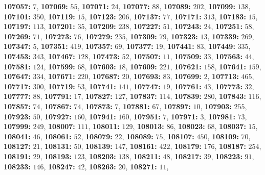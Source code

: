 \textsf{\bfseries 107057:} $7$, \textsf{\bfseries 107069:} $55$, \textsf{\bfseries 107071:} $24$, \textsf{\bfseries 107077:} $88$, \textsf{\bfseries 107089:} $202$, \textsf{\bfseries 107099:} $138$, \textsf{\bfseries 107101:} $350$, \textsf{\bfseries 107119:} $15$, \textsf{\bfseries 107123:} $206$, \textsf{\bfseries 107137:} $77$, \textsf{\bfseries 107171:} $313$, \textsf{\bfseries 107183:} $15$, \textsf{\bfseries 107197:} $113$, \textsf{\bfseries 107201:} $35$, \textsf{\bfseries 107209:} $238$, \textsf{\bfseries 107227:} $51$, \textsf{\bfseries 107243:} $24$, \textsf{\bfseries 107251:} $58$, \textsf{\bfseries 107269:} $71$, \textsf{\bfseries 107273:} $76$, \textsf{\bfseries 107279:} $235$, \textsf{\bfseries 107309:} $79$, \textsf{\bfseries 107323:} $13$, \textsf{\bfseries 107339:} $269$, \textsf{\bfseries 107347:} $5$, \textsf{\bfseries 107351:} $419$, \textsf{\bfseries 107357:} $69$, \textsf{\bfseries 107377:} $19$, \textsf{\bfseries 107441:} $83$, \textsf{\bfseries 107449:} $335$, \textsf{\bfseries 107453:} $343$, \textsf{\bfseries 107467:} $128$, \textsf{\bfseries 107473:} $52$, \textsf{\bfseries 107507:} $11$, \textsf{\bfseries 107509:} $33$, \textsf{\bfseries 107563:} $44$, \textsf{\bfseries 107581:} $124$, \textsf{\bfseries 107599:} $68$, \textsf{\bfseries 107603:} $18$, \textsf{\bfseries 107609:} $221$, \textsf{\bfseries 107621:} $158$, \textsf{\bfseries 107641:} $159$, \textsf{\bfseries 107647:} $334$, \textsf{\bfseries 107671:} $220$, \textsf{\bfseries 107687:} $20$, \textsf{\bfseries 107693:} $83$, \textsf{\bfseries 107699:} $2$, \textsf{\bfseries 107713:} $465$, \textsf{\bfseries 107717:} $300$, \textsf{\bfseries 107719:} $53$, \textsf{\bfseries 107741:} $141$, \textsf{\bfseries 107747:} $19$, \textsf{\bfseries 107761:} $43$, \textsf{\bfseries 107773:} $32$, \textsf{\bfseries 107777:} $88$, \textsf{\bfseries 107791:} $17$, \textsf{\bfseries 107827:} $127$, \textsf{\bfseries 107837:} $114$, \textsf{\bfseries 107839:} $280$, \textsf{\bfseries 107843:} $116$, \textsf{\bfseries 107857:} $74$, \textsf{\bfseries 107867:} $74$, \textsf{\bfseries 107873:} $7$, \textsf{\bfseries 107881:} $67$, \textsf{\bfseries 107897:} $10$, \textsf{\bfseries 107903:} $255$, \textsf{\bfseries 107923:} $50$, \textsf{\bfseries 107927:} $160$, \textsf{\bfseries 107941:} $160$, \textsf{\bfseries 107951:} $7$, \textsf{\bfseries 107971:} $3$, \textsf{\bfseries 107981:} $73$, \textsf{\bfseries 107999:} $249$, \textsf{\bfseries 108007:} $111$, \textsf{\bfseries 108011:} $129$, \textsf{\bfseries 108013:} $86$, \textsf{\bfseries 108023:} $68$, \textsf{\bfseries 108037:} $15$, \textsf{\bfseries 108041:} $46$, \textsf{\bfseries 108061:} $52$, \textsf{\bfseries 108079:} $22$, \textsf{\bfseries 108089:} $75$, \textsf{\bfseries 108107:} $450$, \textsf{\bfseries 108109:} $70$, \textsf{\bfseries 108127:} $21$, \textsf{\bfseries 108131:} $50$, \textsf{\bfseries 108139:} $147$, \textsf{\bfseries 108161:} $422$, \textsf{\bfseries 108179:} $176$, \textsf{\bfseries 108187:} $254$, \textsf{\bfseries 108191:} $29$, \textsf{\bfseries 108193:} $123$, \textsf{\bfseries 108203:} $138$, \textsf{\bfseries 108211:} $48$, \textsf{\bfseries 108217:} $39$, \textsf{\bfseries 108223:} $91$, \textsf{\bfseries 108233:} $146$, \textsf{\bfseries 108247:} $42$, \textsf{\bfseries 108263:} $20$, \textsf{\bfseries 108271:} $11$, 
